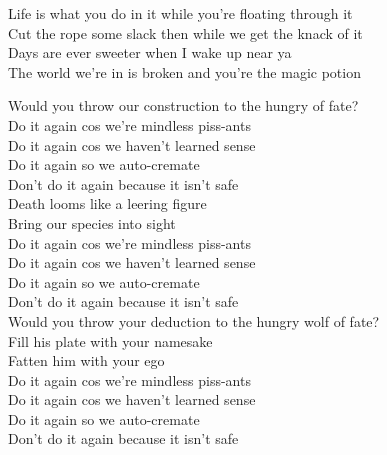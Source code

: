 Life is what you do in it while you're floating through it \\
Cut the rope some slack then while we get the knack of it \\
Days are ever sweeter when I wake up near ya \\
The world we're in is broken and you're the magic potion \\




Would you throw our construction to the hungry  of fate? \\

Do it again cos we're mindless piss-ants \\
Do it again cos we haven't learned sense \\
Do it again so we auto-cremate \\
Don't do it again because it isn't safe \\

Death looms like a leering figure \\
Bring our species into sight \\

Do it again cos we're mindless piss-ants \\
Do it again cos we haven't learned sense \\
Do it again so we auto-cremate \\
Don't do it again because it isn't safe \\

Would you throw your deduction to the hungry wolf of fate? \\
Fill his plate with your namesake \\
Fatten him with your ego \\

Do it again cos we're mindless piss-ants \\
Do it again cos we haven't learned sense \\
Do it again so we auto-cremate \\
Don't do it again because it isn't safe \\
